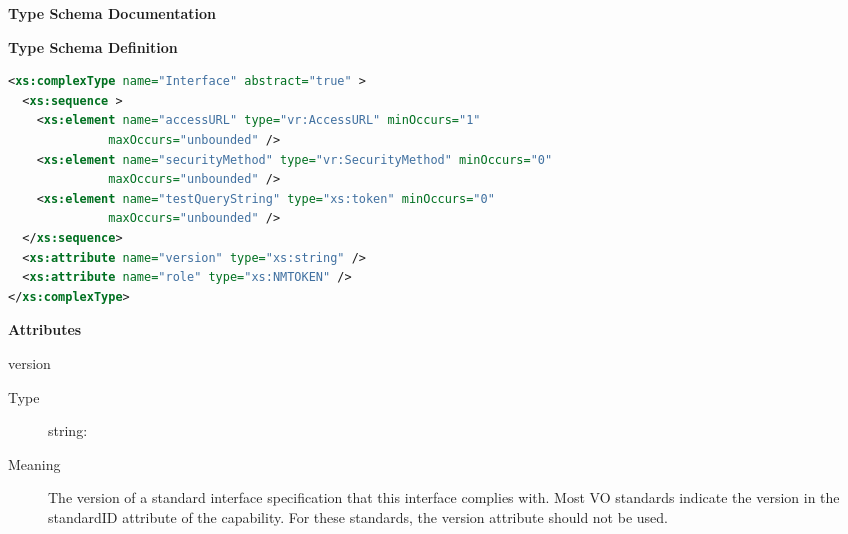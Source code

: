\documentclass[11pt,a4paper]{ivoa}
\begin{document}
\begin{generated}
\begingroup
      	\renewcommand*\descriptionlabel[1]{%
      	\hbox to 5.5em{\emph{#1}\hfil}}\vspace{2ex}\noindent\textbf{ Type Schema Documentation}




\vspace{1ex}\noindent\textbf{ Type Schema Definition}

\begin{lstlisting}[language=XML,basicstyle=\footnotesize]
<xs:complexType name="Interface" abstract="true" >
  <xs:sequence >
    <xs:element name="accessURL" type="vr:AccessURL" minOccurs="1"
              maxOccurs="unbounded" />
    <xs:element name="securityMethod" type="vr:SecurityMethod" minOccurs="0"
              maxOccurs="unbounded" />
    <xs:element name="testQueryString" type="xs:token" minOccurs="0"
              maxOccurs="unbounded" />
  </xs:sequence>
  <xs:attribute name="version" type="xs:string" />
  <xs:attribute name="role" type="xs:NMTOKEN" />
</xs:complexType>
\end{lstlisting}

\vspace{0.5ex}\noindent\textbf{ Attributes}

\begingroup\small\begin{bigdescription}
\item[version]
\begin{description}
\item[Type] string: 
\item[Meaning] 
               The version of a standard interface specification that this 
               interface complies with.  Most VO standards indicate the
               version in the standardID attribute of the capability.  For
               these standards, the version attribute should not be used.
            

\end{description}
\end{bigdescription}
\end{generated}
\end{document}
